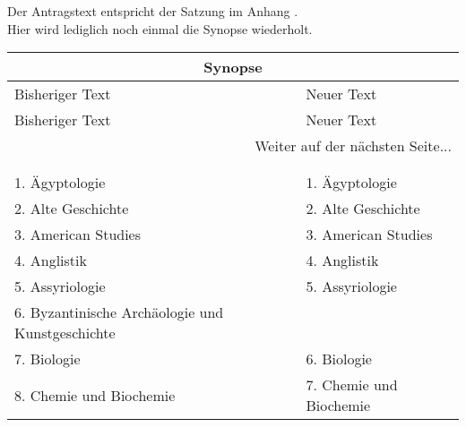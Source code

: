 {       Der Antragstext entspricht der Satzung im Anhang .\\
        Hier wird lediglich noch einmal die Synopse wiederholt.\\[1.5em]
    \begin{longtable}{|p{7.5cm}|p{7.5cm}|}
        \hline
        \multicolumn{2}{|c|}{Synopse}\\\hline
        Bisheriger Text & Neuer Text \\\hline
        \endfirsthead
        \hline
        Bisheriger Text & Neuer Text \\
        \hline
        \endhead
        \hline
        \multicolumn{2}{|r|}{Weiter auf der nächsten Seite...}\\
        \hline
        \endfoot
        \hline
        \multicolumn{2}{c}{Ende der Synopse} \\
        \endlastfoot
        \multicolumn{2}{|c|}{Anhang D}\\\hline
        1. Ägyptologie                                                   & 1. Ägyptologie                                                   \\
        2. Alte Geschichte                                               & 2. Alte Geschichte                                               \\
        3. American Studies                                              & 3. American Studies                                              \\
        4. Anglistik                                                     & 4. Anglistik                                                     \\
        5. Assyriologie                                                  & 5. Assyriologie                                                  \\
        6. Byzantinische Archäologie und Kunstgeschichte                 &                                                                  \\
        7. Biologie                                                      & 6. Biologie                                                      \\
        8. Chemie und Biochemie                                          & 7. Chemie und Biochemie                                          \\

\end{longtable}}
